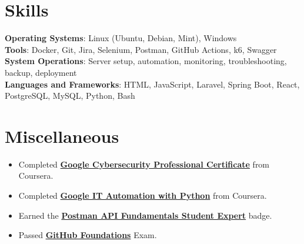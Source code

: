 \documentclass[letterpaper,11pt]{article}
\newcommand{\resumeItem}[1]{
  \item\small{
    {#1 \vspace{-2pt}}
  }
}
\newcommand{\resumeSubHeadingListEnd}{\end{itemize}}
\newcommand{\resumeItemListStart}{\begin{itemize}}
\newcommand{\resumeItemListEnd}{\end{itemize}\vspace{-5pt}}
\begin{document}


\section{Skills}
\begin{itemize}[leftmargin=0.15in, label={}]
   \small{\item{
    \textbf{Operating Systems}{: Linux (Ubuntu, Debian, Mint), Windows} \\
    \textbf{Tools}{: Docker, Git, Jira, Selenium, Postman, GitHub Actions, k6, Swagger} \\
    \textbf{System Operations}{: Server setup, automation, monitoring, troubleshooting, backup, deployment} \\
    \textbf{Languages and Frameworks}{: HTML, JavaScript, Laravel, Spring Boot, React, PostgreSQL, MySQL, Python, Bash} \\
   }}
\end{itemize}





\section{Miscellaneous}
\resumeItemListStart
\resumeItem{Completed \href{https://coursera.org/share/44fd8f381cb39ac45892569cdf6f7674}{\textbf{Google Cybersecurity Professional Certificate}} from Coursera.}
\resumeItem{Completed \href{https://coursera.org/share/2afadc6ce043cc25337eb8c8fe61c9b6}{\textbf{Google IT Automation with Python}} from Coursera.}
\resumeItem{Earned the \href{https://badges.parchment.com/public/assertions/ZF0yx-i3T1CvXYwDLEUneA?identity__email=sakib.sadman.badhon\%40g.bracu.ac.bd}{\textbf{Postman API Fundamentals Student Expert}} badge.}
\resumeItem{Passed \href{https://www.credly.com/badges/d5c30c19-02db-4c5f-9bc9-4bd0f4b6a89e/public_url}{\textbf{GitHub Foundations}} Exam.}
\resumeItemListEnd



\end{document}
